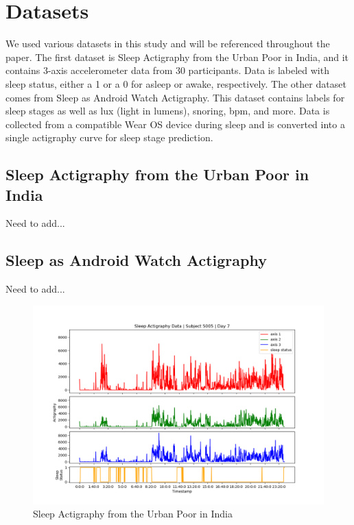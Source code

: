 \documentclass[12pt]{report}
\begin{document}
\pagebreak

\section{Datasets}

We used various datasets in this study and will be referenced throughout the paper. The first dataset is Sleep Actigraphy from the Urban Poor in India, and it contains 3-axis accelerometer data from 30 participants. Data is labeled with sleep status, either a 1 or a 0 for asleep or awake, respectively. The other dataset comes from Sleep as Android Watch Actigraphy. This dataset contains labels for sleep stages as well as lux (light in lumens), snoring, bpm, and more. Data is collected from a compatible Wear OS device during sleep and is converted into a single actigraphy curve for sleep stage prediction.

\subsection{Sleep Actigraphy from the Urban Poor in India}
Need to add...

\subsection{Sleep as Android Watch Actigraphy}
Need to add...

\pagebreak

\begin{figure}
  \begin{center}
    \includegraphics[width=1\linewidth]{model_test_subject5005_day7}
    \caption{Sleep Actigraphy from the Urban Poor in India\cite{zhang}\cite{bessone}}
    \label{urban-poor}
  \end{center}
\end{figure}
\end{document}
